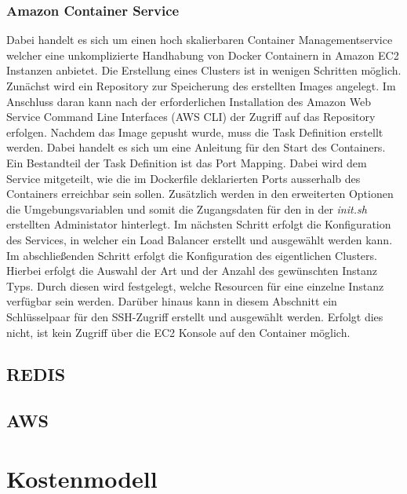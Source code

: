 \documentclass[paper,oneside,onecolumn,notitlepage,bibtotocnumbered,fontsize=12pt,bigheadings,ngerman]{scrartcl}
\begin{document}
\subsubsection{Amazon Container Service}
Dabei handelt es sich um einen hoch skalierbaren Container Managementservice welcher eine unkomplizierte Handhabung von Docker Containern in Amazon EC2 Instanzen anbietet. Die Erstellung eines Clusters ist in wenigen Schritten möglich. Zunächst wird ein Repository zur Speicherung des erstellten Images angelegt. Im Anschluss daran kann nach der erforderlichen Installation des Amazon Web Service Command Line Interfaces (AWS CLI) der Zugriff auf das Repository erfolgen. Nachdem das Image gepusht wurde, muss die Task Definition erstellt werden. Dabei handelt es sich um eine Anleitung für den Start des Containers. Ein Bestandteil der Task Definition ist das Port Mapping. Dabei wird dem Service mitgeteilt, wie die im Dockerfile deklarierten Ports ausserhalb des Containers erreichbar sein sollen. Zusätzlich werden in den erweiterten Optionen die Umgebungsvariablen und somit die Zugangsdaten für den in der \emph{init.sh} erstellten Administator hinterlegt. Im nächsten Schritt erfolgt die Konfiguration des Services, in welcher ein Load Balancer erstellt und ausgewählt werden kann. Im abschließenden Schritt erfolgt die Konfiguration des eigentlichen Clusters. Hierbei erfolgt die Auswahl der Art und der Anzahl des gewünschten Instanz Typs. Durch diesen wird festgelegt, welche Resourcen für eine einzelne Instanz verfügbar sein werden. Darüber hinaus kann in diesem Abschnitt ein Schlüsselpaar für den SSH-Zugriff erstellt und ausgewählt werden. Erfolgt dies nicht, ist kein Zugriff über die EC2 Konsole auf den Container möglich.



\subsection{REDIS}
\subsection{AWS}


\section{Kostenmodell}
\end{document}
